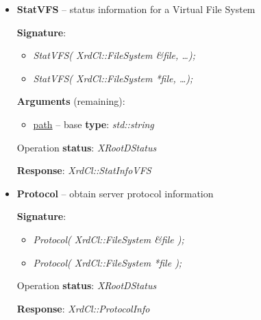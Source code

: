 \documentclass{article}
\begin{document}
\begin{itemize}
\begin{samepage}
                \end{samepage}
                    
                \item \begin{samepage} \textbf{StatVFS} -- status information for a Virtual File System

                    \textbf{Signature}:
                    \begin{itemize}
                        \item \textit{StatVFS( XrdCl::FileSystem \&file, \ldots);}
                        \item \textit{StatVFS( XrdCl::FileSystem *file, \ldots );}
                    \end{itemize}

                    \textbf{Arguments} (remaining):
                    \begin{itemize}
                        \item \underline{path} -- base \textbf{type}: \textit{std::string}
                    \end{itemize}

                    Operation \textbf{status}: \textit{XRootDStatus}

                    \textbf{Response}: \textit{XrdCl::StatInfoVFS}
                    
                \end{samepage}
                    
                \item \begin{samepage} \textbf{Protocol} -- obtain server protocol information

                    \textbf{Signature}:
                    \begin{itemize}
                        \item \textit{Protocol( XrdCl::FileSystem \&file );}
                        \item \textit{Protocol( XrdCl::FileSystem *file  );}
                    \end{itemize}

                    Operation \textbf{status}: \textit{XRootDStatus}

                    \textbf{Response}: \textit{XrdCl::ProtocolInfo}
                    
                \end{samepage}
                    

\end{itemize}
\end{document}
